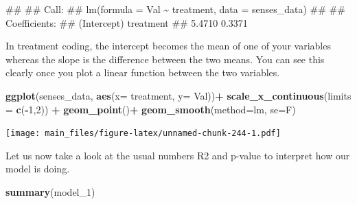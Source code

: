 \documentclass[
]{book}
\newenvironment{Shaded}{\begin{snugshade}}{\end{snugshade}}
\newcommand{\AttributeTok}[1]{\textcolor[rgb]{0.13,0.29,0.53}{#1}}
\newcommand{\DecValTok}[1]{\textcolor[rgb]{0.00,0.00,0.81}{#1}}
\newcommand{\FunctionTok}[1]{\textcolor[rgb]{0.13,0.29,0.53}{\textbf{#1}}}
\newcommand{\NormalTok}[1]{#1}
\newcommand{\SpecialCharTok}[1]{\textcolor[rgb]{0.81,0.36,0.00}{\textbf{#1}}}
\newcommand{\StringTok}[1]{\textcolor[rgb]{0.31,0.60,0.02}{#1}}
\begin{document}
\begin{Shaded}
\begin{Highlighting}[]
\NormalTok{\#\# }
\NormalTok{\#\# Call:}
\NormalTok{\#\# lm(formula = Val \textasciitilde{} treatment, data = senses\_data)}
\NormalTok{\#\# }
\NormalTok{\#\# Coefficients:}
\NormalTok{\#\# (Intercept)    treatment  }
\NormalTok{\#\#      5.4710       0.3371}
\end{Highlighting}
\end{Shaded}

In treatment coding, the intercept becomes the mean of one of your variables whereas the slope is the difference between the two means. You can see this clearly once you plot a linear function between the two variables.

\begin{Shaded}
\begin{Highlighting}[]
\FunctionTok{ggplot}\NormalTok{(senses\_data, }\FunctionTok{aes}\NormalTok{(}\AttributeTok{x=}\NormalTok{ treatment, }\AttributeTok{y=}\NormalTok{ Val))}\SpecialCharTok{+}
  \FunctionTok{scale\_x\_continuous}\NormalTok{(}\AttributeTok{limits =} \FunctionTok{c}\NormalTok{(}\SpecialCharTok{{-}}\DecValTok{1}\NormalTok{,}\DecValTok{2}\NormalTok{)) }\SpecialCharTok{+}
  \FunctionTok{geom\_point}\NormalTok{()}\SpecialCharTok{+}
  \FunctionTok{geom\_smooth}\NormalTok{(}\AttributeTok{method=}\StringTok{\textquotesingle{}lm\textquotesingle{}}\NormalTok{, }\AttributeTok{se=}\NormalTok{F)}
\end{Highlighting}
\end{Shaded}

\texttt{[image: main\_files/figure-latex/unnamed-chunk-244-1.pdf]}

Let us now take a look at the usual numbers R2 and p-value to interpret how our model is doing.

\begin{Shaded}
\begin{Highlighting}[]
\FunctionTok{summary}\NormalTok{(model\_1)}
\end{Highlighting}
\end{Shaded}
\end{document}
